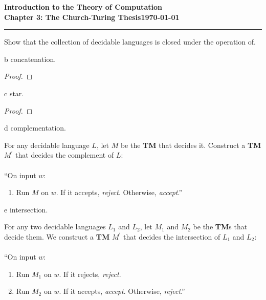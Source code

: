 \documentclass[11pt]{article}
\newcommand{\dated}{\today}
\begin{document}
\textbf{Introduction to the Theory of
Computation}\hfill\textbf{\myname}\\[0.01in]
\textbf{Chapter 3: The Church-Turing Thesis}\hfill\textbf{\dated}\\
\smallskip\hrule\bigskip

\begin{problem}{3.15}
Show that the collection of decidable languages is closed under the operation of.
\end{problem}

\begin{problem}[Part]{b}
concatenation.
\end{problem}

\begin{proof}
\end{proof}

\begin{problem}[Part]{c}
star.
\end{problem}

\begin{proof}
\end{proof}

\begin{problem}[Part]{d}
complementation.
\end{problem}

For any decidable language $L$, let $M$ be the \textbf{TM} that decides it. Construct a \textbf{TM} $M^{'}$ that decides the complement of $L$:
\\
\\
\textquotedblleft On input $w$:
\begin{enumerate}
\item Run $M$ on $w$. If it accepts, \textit{reject}. Otherwise, \textit{accept}.\textquotedblright
\end{enumerate}

\begin{problem}[Part]{e}
intersection.
\end{problem}

For any two decidable languages $L_1$ and $L_2$, let $M_1$ and $M_2$ be the \textbf{TM}s that decide them. We construct a \textbf{TM} $M^{'}$ that decides the intersection of $L_1$ and $L_2$:
\\
\\
\textquotedblleft On input $w$:
\begin{enumerate}
\item Run $M_1$ on $w$. If it rejects, \textit{reject}.
\item Run $M_2$ on $w$. If it accepts, \textit{accept}. Otherwise, \textit{reject}.\textquotedblright
\end{enumerate}
\end{document}
